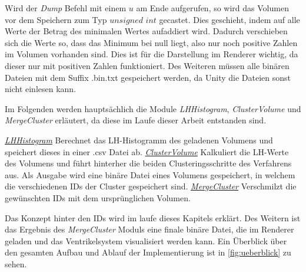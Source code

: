 Wird der \textit{Dump} Befehl mit einem $u$ am Ende aufgerufen, so wird das Volumen vor dem Speichern zum Typ $unsigned$ $int$ gecastet. Dies geschieht, indem auf alle Werte der Betrag des minimalen Wertes aufaddiert wird. Dadurch verschieben sich die Werte so, dass das Minimum bei null liegt, also nur noch positive Zahlen im Volumen vorhanden sind. Dies ist für die Darstellung im Renderer wichtig, da dieser nur mit positiven Zahlen funktioniert. Des Weiteren müssen alle binären Dateien mit dem Suffix .bin.txt gespeichert werden, da Unity die Dateien sonst nicht einlesen kann.


Im Folgenden werden hauptsächlich die Module \textit{LHHistogram}, \textit{ClusterVolume} und \textit{MergeCluster} erläutert, da diese im Laufe dieser Arbeit entstanden sind.


\underline{\textit{LHHistogram}}
\newline
 Berechnet das LH-Histogramm des geladenen Volumens und speichert dieses in einer .csv Datei ab.
\newline
\underline{\textit{ClusterVolume}}
\newline
Kalkuliert die LH-Werte des Volumens und führt hinterher die beiden Clusteringsschritte des Verfahrens aus. Als Ausgabe wird eine binäre Datei eines Volumens gespeichert, in welchem die verschiedenen IDs der Cluster gespeichert sind.
\newline
\underline{\textit{MergeCluster}}
\newline
Verschmilzt die gewünschten IDs mit dem ursprünglichen Volumen.

Das Konzept hinter den IDs wird im laufe dieses Kapitels erklärt. Des Weitern ist das Ergebnis des \textit{MergeCluster} Moduls eine finale binäre Datei, die im Renderer geladen und das Ventrikelsystem visualisiert werden kann. Ein Überblick über den gesamten Aufbau und Ablauf der Implementierung ist in  \autoref{fig:ueberblick} zu sehen.


